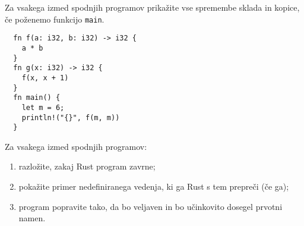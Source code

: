 \documentclass[arhiv]{../izpit}
\begin{document}


\naloga[\tocke{15}]

Za vsakega izmed spodnjih programov prikažite vse spremembe sklada in kopice, če poženemo funkcijo \texttt{main}.

\podnaloga
\begin{verbatim}
  fn f(a: i32, b: i32) -> i32 {
    a * b
  }
  fn g(x: i32) -> i32 {
    f(x, x + 1)
  }
  fn main() {
    let m = 6;
    println!("{}", f(m, m))
  }
\end{verbatim}

\podnaloga

\podnaloga



\naloga[\tocke{35}]

Za vsakega izmed spodnjih programov:
\begin{enumerate}
  \item razložite, zakaj Rust program zavrne;
  \item pokažite primer nedefiniranega vedenja, ki ga Rust s tem prepreči (če ga);
  \item program popravite tako, da bo veljaven in bo učinkovito dosegel prvotni namen.
\end{enumerate}

\podnaloga

\podnaloga

\podnaloga

\podnaloga

\podnaloga
\end{document}
